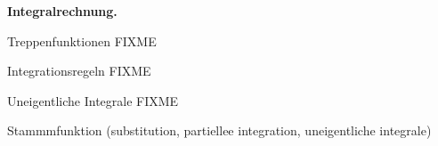 \textbf{Integralrechnung.}

Treppenfunktionen FIXME

Integrationsregeln FIXME

Uneigentliche Integrale FIXME

Stammmfunktion (substitution, partiellee integration, uneigentliche integrale)

